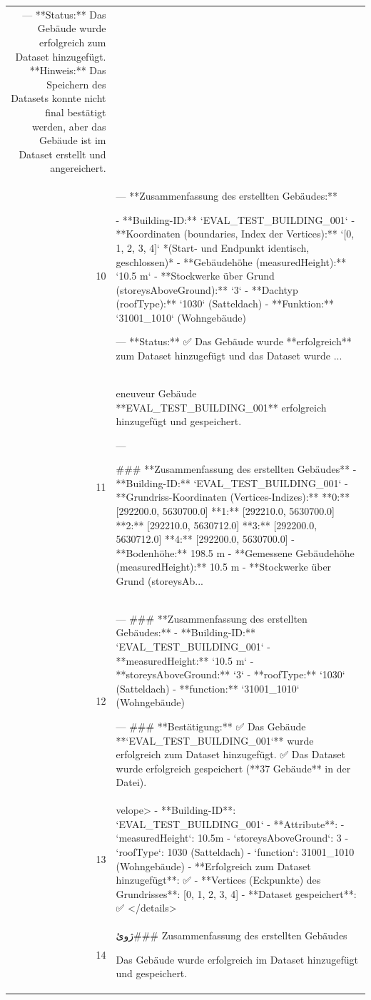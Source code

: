 \documentclass[a4paper,11pt]{article}
\begin{document}
\begin{table}[ht]
\begin{tabular}{r p{12cm}}
---
**Status:** Das Gebäude wurde erfolgreich zum Dataset hinzugefügt.
**Hinweis:** Das Speichern des Datasets konnte nicht final bestätigt werden, aber das Gebäude ist im Dataset erstellt und angereichert. \\
10 & ---
**Zusammenfassung des erstellten Gebäudes:**

- **Building-ID:** `EVAL\_TEST\_BUILDING\_001`
- **Koordinaten (boundaries, Index der Vertices):**
  `[0, 1, 2, 3, 4]` *(Start- und Endpunkt identisch, geschlossen)*
- **Gebäudehöhe (measuredHeight):** `10.5 m`
- **Stockwerke über Grund (storeysAboveGround):** `3`
- **Dachtyp (roofType):** `1030` (Satteldach)
- **Funktion:** `31001\_1010` (Wohngebäude)

---
**Status:**
✅ Das Gebäude wurde **erfolgreich** zum Dataset hinzugefügt und das Dataset wurde ... \\
11 & eneuveur Gebäude **EVAL\_TEST\_BUILDING\_001** erfolgreich hinzugefügt und gespeichert.

---

\#\#\# **Zusammenfassung des erstellten Gebäudes**
- **Building-ID:** `EVAL\_TEST\_BUILDING\_001`
- **Grundriss-Koordinaten (Vertices-Indizes):**
  **0:** [292200.0, 5630700.0]
  **1:** [292210.0, 5630700.0]
  **2:** [292210.0, 5630712.0]
  **3:** [292200.0, 5630712.0]
  **4:** [292200.0, 5630700.0]
- **Bodenhöhe:** 198.5 m
- **Gemessene Gebäudehöhe (measuredHeight):** 10.5 m
- **Stockwerke über Grund (storeysAb... \\
12 & ---
\#\#\# **Zusammenfassung des erstellten Gebäudes:**
- **Building-ID:** `EVAL\_TEST\_BUILDING\_001`
- **measuredHeight:** `10.5 m`
- **storeysAboveGround:** `3`
- **roofType:** `1030` (Satteldach)
- **function:** `31001\_1010` (Wohngebäude)

---
\#\#\# **Bestätigung:**
✅ Das Gebäude **`EVAL\_TEST\_BUILDING\_001`** wurde erfolgreich zum Dataset hinzugefügt.
✅ Das Dataset wurde erfolgreich gespeichert (**37 Gebäude** in der Datei). \\
13 & velope>
- **Building-ID**: `EVAL\_TEST\_BUILDING\_001`
- **Attribute**:
  - `measuredHeight`: 10.5m
  - `storeysAboveGround`: 3
  - `roofType`: 1030 (Satteldach)
  - `function`: 31001\_1010 (Wohngebäude)
- **Erfolgreich zum Dataset hinzugefügt**: ✅
- **Vertices (Eckpunkte) des Grundrisses**: [0, 1, 2, 3, 4]
- **Dataset gespeichert**: ✅
</details> \\
14 &  ژوئ\#\#\# Zusammenfassung des erstellten Gebäudes

Das Gebäude wurde erfolgreich im Dataset hinzugefügt und gespeichert.


\end{tabular}
\end{table}
\end{document}
